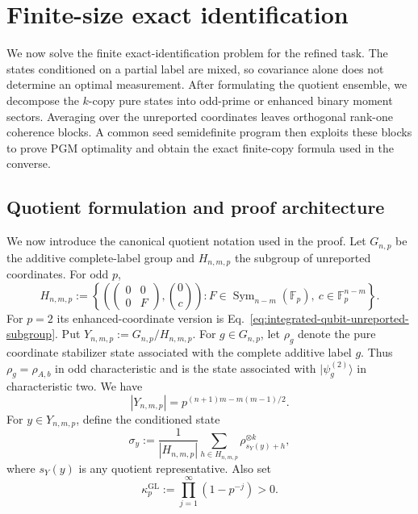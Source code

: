 \documentclass[11pt]{article}
\newcommand{\F}{\mathbb F}
\newcommand{\Sym}{\operatorname{Sym}}
\newcommand{\1}{\mathbf 1}
\newcommand{\ket}[1]{\lvert #1\rangle}
\theoremstyle{plain}
\theoremstyle{definition}
\theoremstyle{remark}
\begin{document}
\section{Finite-size exact identification}
\label{sec:common-finite-size-framework}
We now solve the finite exact-identification problem for the refined task.
The states conditioned on a partial label are mixed, so covariance alone does
not determine an optimal measurement.  After formulating the quotient
ensemble, we decompose the $k$-copy pure states into odd-prime or enhanced binary
moment sectors.  Averaging over the unreported coordinates leaves orthogonal
rank-one coherence blocks.  A common seed semidefinite program then exploits
these blocks to prove PGM optimality and obtain the exact finite-copy formula
used in the converse.

\subsection{Quotient formulation and proof architecture}
\label{subsec:finite-size-quotient-architecture}

We now introduce the canonical quotient notation used in the proof.  Let
$G_{n,p}$ be the additive complete-label group and $H_{n,m,p}$ the subgroup of
unreported coordinates.  For odd $p$,
\begin{equation}
 H_{n,m,p}:=\left\{\left(\begin{pmatrix}0&0\\0&F\end{pmatrix},
 \binom{0}{c}\right):F\in\Sym_{n-m}(\F_p),\ c\in\F_p^{n-m}\right\}.
 \label{eq:H}
\end{equation}
For $p=2$ its enhanced-coordinate version is
Eq.~\eqref{eq:integrated-qubit-unreported-subgroup}.  Put
$Y_{n,m,p}:=G_{n,p}/H_{n,m,p}$.  For $g\in G_{n,p}$, let $\rho_g$
denote the pure coordinate stabilizer state associated with the complete
additive label $g$.  Thus $\rho_g=\rho_{A,b}$ in odd characteristic and is
the state associated with $\ket{\psi_g^{(2)}}$ in characteristic two.  We have
\begin{equation}
 |Y_{n,m,p}|=p^{(n+1)m-m(m-1)/2}.
 \label{eq:Y-size}
\end{equation}
For $y\in Y_{n,m,p}$, define the conditioned state
\begin{equation}
 \sigma_y:=\frac1{|H_{n,m,p}|}\sum_{h\in H_{n,m,p}}
 \rho_{s_Y(y)+h}^{\otimes k},
 \label{eq:sigma-y}
\end{equation}
where $s_Y(y)$ is any quotient representative.  Also set
\begin{equation}
 \kappa_p^{\mathrm{GL}}:=\prod_{j=1}^{\infty}(1-p^{-j})>0.
 \label{eq:kappa-GL-product}
\end{equation}
\end{document}
